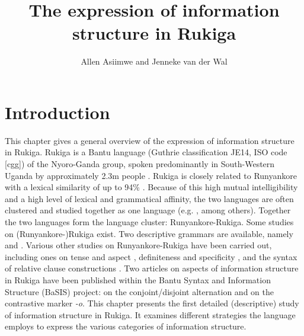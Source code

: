 \documentclass[output=paper]{langscibook}
\author{Allen Asiimwe\orcid{}\affiliation{Makerere University} and Jenneke van der Wal\orcid{}\affiliation{Leiden University}}
\title{The expression of information structure in Rukiga}
\begin{document}
\maketitle 
\label{ch:6}





\section{Introduction}\label{sec:intro}

This chapter gives a general overview of the expression of information structure in Rukiga. Rukiga is a Bantu language (Guthrie classification JE14, ISO code [cgg]) of the Nyoro-Ganda group, spoken predominantly in South-Western Uganda by approximately 2.3m people \citep{U.B.O.S.2016}. Rukiga is closely related to Runyankore with a lexical similarity of up to 94\% \citep{EberhardEtAl2020}. Because of this high mutual intelligibility and a high level of lexical and grammatical affinity, the two languages are often clustered and studied together as one language (e.g. \citealt{Taylor1985,Turamyomwe2011,Asiimwe2014,Ndoleriire2020}, among others). Together the two languages form the language cluster: Runyankore-Rukiga. Some studies on (Runyankore-)Rukiga exist. Two descriptive grammars are available, namely \citet{MorrisKirwan1972} and \citet{Taylor1985}. Various other studies on Runyankore-Rukiga have been carried out, including ones on tense and aspect \citep{Turamyomwe2011,Asiimwe2024b}, definiteness and specificity \citep{Asiimwe2014}, and the syntax of relative clause constructions \citep{Asiimwe2019}. Two articles on aspects of information structure in Rukiga have been published within the Bantu Syntax and Information Structure (BaSIS) project: \citet{vanderWalAsiimwe2020} on the conjoint/disjoint alternation and \citet{AsiimwevanderWal2021} on the contrastive marker \textit{-o}. This chapter presents the first detailed (descriptive) study of information structure in Rukiga. It examines different strategies the language employs to express the various categories of information structure.
\end{document}
